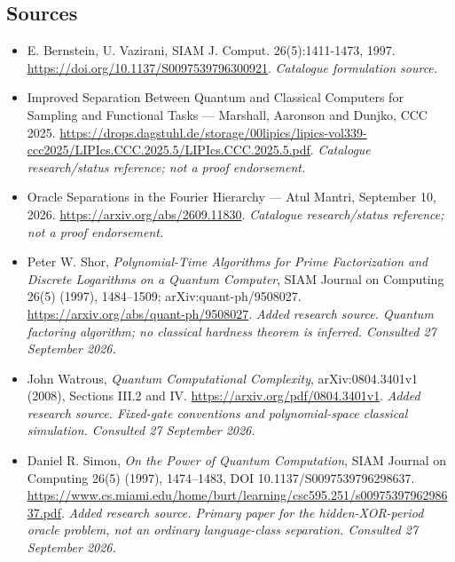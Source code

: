 \documentclass[11pt,a4paper]{article}
\begin{document}
\subsection{Sources}
\begin{itemize}\raggedright
\item[\textnormal{[S1]}]\hypertarget{source:statement:1}{} E. Bernstein, U. Vazirani, SIAM J. Comput. 26(5):1411-1473, 1997.
\url{https://doi.org/10.1137/S0097539796300921}.
{\small\textit{Catalogue formulation source.}}
\item[\textnormal{[S2]}]\hypertarget{source:statement:2}{} Improved Separation Between Quantum and Classical Computers for Sampling and Functional Tasks — Marshall, Aaronson and Dunjko, CCC 2025.
\url{https://drops.dagstuhl.de/storage/00lipics/lipics-vol339-ccc2025/LIPIcs.CCC.2025.5/LIPIcs.CCC.2025.5.pdf}.
{\small\textit{Catalogue research/status reference; not a proof endorsement.}}
\item[\textnormal{[S3]}]\hypertarget{source:statement:3}{} Oracle Separations in the Fourier Hierarchy — Atul Mantri, September 10, 2026.
\url{https://arxiv.org/abs/2609.11830}.
{\small\textit{Catalogue research/status reference; not a proof endorsement.}}
\item[\textnormal{[E1]}]\hypertarget{extra:statement:1}{} Peter W. Shor, \emph{Polynomial-Time Algorithms for Prime Factorization and Discrete Logarithms on a Quantum Computer}, SIAM Journal on Computing 26(5) (1997), 1484--1509; arXiv:quant-ph/9508027.
\url{https://arxiv.org/abs/quant-ph/9508027}.
{\small\textit{Added research source. Quantum factoring algorithm; no classical hardness theorem is inferred. Consulted 27 September 2026.}}
\item[\textnormal{[E2]}]\hypertarget{extra:statement:2}{} John Watrous, \emph{Quantum Computational Complexity}, arXiv:0804.3401v1 (2008), Sections III.2 and IV.
\url{https://arxiv.org/pdf/0804.3401v1}.
{\small\textit{Added research source. Fixed-gate conventions and polynomial-space classical simulation. Consulted 27 September 2026.}}
\item[\textnormal{[E3]}]\hypertarget{extra:statement:3}{} Daniel R. Simon, \emph{On the Power of Quantum Computation}, SIAM Journal on Computing 26(5) (1997), 1474--1483, DOI 10.1137/S0097539796298637.
\url{https://www.cs.miami.edu/home/burt/learning/csc595.251/s0097539796298637.pdf}.
{\small\textit{Added research source. Primary paper for the hidden-XOR-period oracle problem, not an ordinary language-class separation. Consulted 27 September 2026.}}
\end{itemize}

\end{document}
